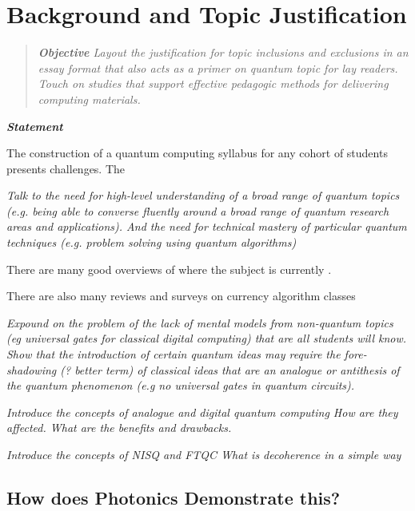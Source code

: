 \section{Background and Topic Justification}

\begin{quote}\itshape
	\textbf{\emph{Objective}}
	Layout the justification for topic inclusions and exclusions in an essay format that also acts as a primer on quantum topic for lay readers.
	Touch on studies that support effective pedagogic methods for delivering computing materials.
\end{quote}\ignorespacesafterend


\textbf{\emph{Statement}}


The construction of a quantum computing syllabus for any cohort of students presents challenges. 
The 

\emph{
Talk to the need for high-level understanding of a broad range of quantum topics 
(e.g. being able to converse fluently around a broad range of quantum research areas and applications).
And the need for technical mastery of particular quantum techniques 
(e.g. problem solving using quantum algorithms)
}

There are many good overviews of where the subject is currently \cite{Preskill:2023}.

\cite{Abhijith:2022}

There are also many reviews and surveys on currency algorithm classes \cite{Arnault:2024} \cite{Jordan:2024} 

\emph{
Expound on the problem of the lack of mental models from non-quantum topics (eg universal gates for classical digital computing)
that are all students will know.
Show that the introduction of certain quantum ideas may require the fore-shadowing (? better term) of classical ideas 
that are an analogue or antithesis of the quantum phenomenon (e.g no universal gates in quantum circuits).
}

\emph{
	Introduce the concepts of analogue and digital quantum computing
	How are they affected.  What are the benefits and drawbacks.
}

\emph{
	Introduce the concepts of NISQ and FTQC
	What is decoherence in a simple way
}



\subsection{How does Photonics Demonstrate this?}

